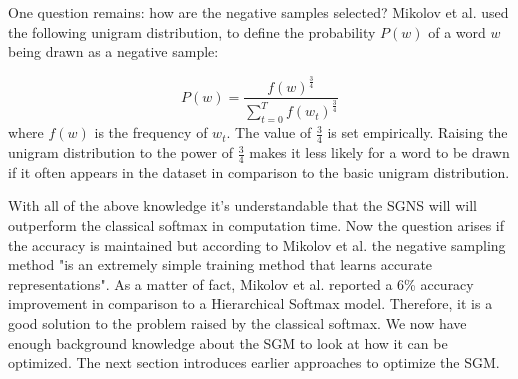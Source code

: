 One question remains: how are the negative samples selected? Mikolov et al. \citep{mikolov2} used the following unigram distribution, to define the probability $P(w)$ of a word $w$ being drawn as a negative sample:

\begin{equation} \label{eq:unigram}
P(w)=\frac{f(w)^{\frac{3}{4}}}{\sum_{t=0}^{T} f(w_t)^{\frac{3}{4}}}
\end{equation}
where $f(w)$ is the frequency of $w_t$. The value of $\frac{3}{4}$ is set empirically. Raising the unigram distribution to the power of $\frac{3}{4}$ makes it less likely for a word to be drawn if it often appears in the dataset in comparison to the basic unigram distribution.

With all of the above knowledge it's understandable that the SGNS will  will outperform the classical softmax in computation time. Now the question arises if the accuracy is maintained but according to Mikolov et al. \citep{mikolov2} the negative sampling method "is an extremely simple training method that learns accurate representations". As a matter of fact, Mikolov et al. \citep{mikolov2} reported a 6\% accuracy improvement in comparison to a Hierarchical Softmax model. Therefore, it is a good solution to the problem raised by the classical softmax.
We now have enough background knowledge about the SGM to look at how it can be optimized. The next section introduces earlier approaches to optimize the SGM.